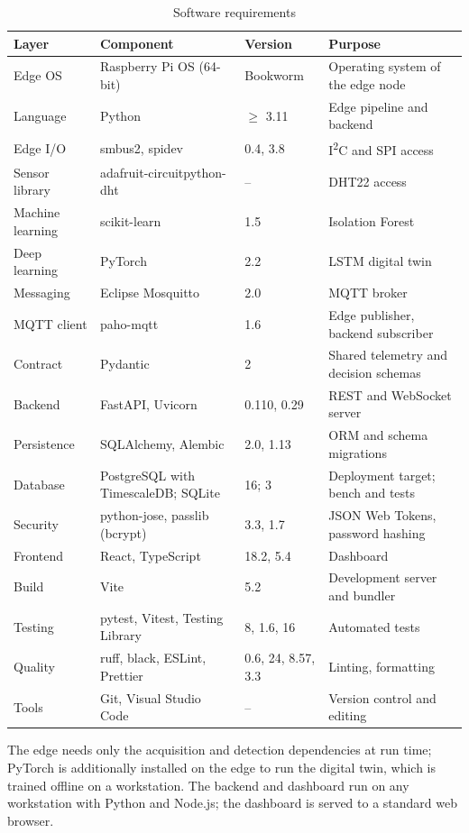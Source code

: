 \begin{table}[htbp]
\centering
\caption{Software requirements}
\label{tab:software}
\small
\begin{tabularx}{\textwidth}{@{}P{2.5cm} P{4.4cm} P{2.0cm} X@{}}
\toprule
\textbf{Layer} & \textbf{Component} & \textbf{Version} & \textbf{Purpose} \\
\midrule
Edge OS & Raspberry Pi OS (64-bit) & Bookworm & Operating system of the edge node \\
Language & Python & $\geq$ 3.11 & Edge pipeline and backend \\
Edge I/O & smbus2, spidev & 0.4, 3.8 & I\textsuperscript{2}C and SPI access \\
Sensor library & adafruit-circuitpython-dht & -- & DHT22 access \\
Machine learning & scikit-learn & 1.5 & Isolation Forest \\
Deep learning & PyTorch & 2.2 & LSTM digital twin \\
Messaging & Eclipse Mosquitto & 2.0 & MQTT broker \\
MQTT client & paho-mqtt & 1.6 & Edge publisher, backend subscriber \\
Contract & Pydantic & 2 & Shared telemetry and decision schemas \\
Backend & FastAPI, Uvicorn & 0.110, 0.29 & REST and WebSocket server \\
Persistence & SQLAlchemy, Alembic & 2.0, 1.13 & ORM and schema migrations \\
Database & PostgreSQL with TimescaleDB; SQLite & 16; 3 & Deployment target; bench and tests \\
Security & python-jose, passlib (bcrypt) & 3.3, 1.7 & JSON Web Tokens, password hashing \\
Frontend & React, TypeScript & 18.2, 5.4 & Dashboard \\
Build & Vite & 5.2 & Development server and bundler \\
Testing & pytest, Vitest, Testing Library & 8, 1.6, 16 & Automated tests \\
Quality & ruff, black, ESLint, Prettier & 0.6, 24, 8.57, 3.3 & Linting, formatting \\
Tools & Git, Visual Studio Code & -- & Version control and editing \\
\bottomrule
\end{tabularx}
\end{table}

The edge needs only the acquisition and detection dependencies at run time; PyTorch is additionally installed on the edge to run the digital twin, which is trained offline on a workstation. The backend and dashboard run on any workstation with Python and Node.js; the dashboard is served to a standard web browser.

